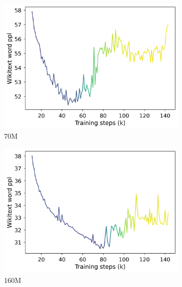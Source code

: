 \begin{figure}[h]
    \begin{subfigure}{0.32\columnwidth}
         \includegraphics[width=\linewidth]{sources/part_1/softmax_bottleneck/imgs/anisotropy_explosion_70m.png}
         \caption{70M}
         \label{fig:70M}
    \end{subfigure}
    \begin{subfigure}{0.32\columnwidth}
         \includegraphics[width=\linewidth]{sources/part_1/softmax_bottleneck/imgs/anisotropy_explosion_160m.png}
         \caption{160M}
         \label{fig:160M}
    \end{subfigure}
    \begin{subfigure}{0.33\columnwidth}

\end{subfigure}
\end{figure}
